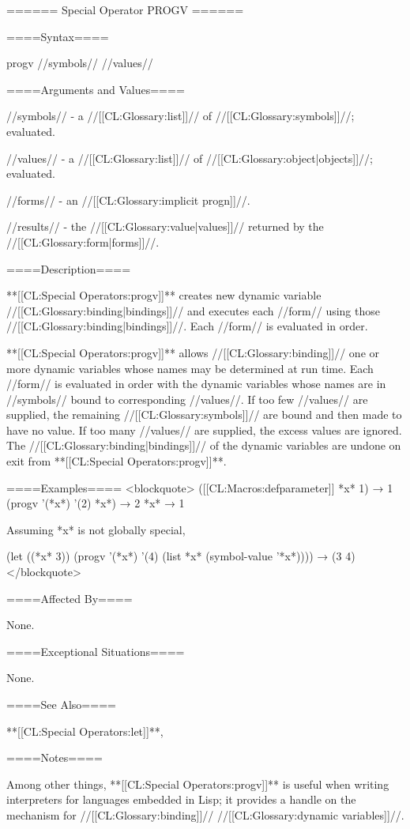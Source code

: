 ====== Special Operator PROGV ======

====Syntax====

\DefspecWithValues progv {//symbols// //values// } {}

====Arguments and Values====

//symbols// - a //[[CL:Glossary:list]]// of //[[CL:Glossary:symbols]]//; evaluated.

//values// - a //[[CL:Glossary:list]]// of //[[CL:Glossary:object|objects]]//; evaluated.

//forms// - an //[[CL:Glossary:implicit progn]]//.

//results// - the //[[CL:Glossary:value|values]]// returned by the //[[CL:Glossary:form|forms]]//.

====Description====

**[[CL:Special Operators:progv]]** creates new dynamic variable //[[CL:Glossary:binding|bindings]]// and executes each //form// using those //[[CL:Glossary:binding|bindings]]//. Each //form// is evaluated in order.

**[[CL:Special Operators:progv]]** allows //[[CL:Glossary:binding]]// one or more dynamic variables whose names may be determined at run time. Each //form// is evaluated in order with the dynamic variables whose names are in //symbols// bound to corresponding //values//. If too few //values// are supplied, the remaining //[[CL:Glossary:symbols]]// are bound and then made to have no value. If too many //values// are supplied, the excess values are ignored. The //[[CL:Glossary:binding|bindings]]// of the dynamic variables are undone on exit from **[[CL:Special Operators:progv]]**.

====Examples==== <blockquote> ([[CL:Macros:defparameter]] *x* 1) → 1 (progv '(*x*) '(2) *x*) → 2 *x* → 1

Assuming *x* is not globally special,

(let ((*x* 3)) (progv '(*x*) '(4) (list *x* (symbol-value '*x*)))) → (3 4) </blockquote>

====Affected By====

None.

====Exceptional Situations====

None.

====See Also====

**[[CL:Special Operators:let]]**, {\secref\Evaluation}

====Notes====

Among other things, **[[CL:Special Operators:progv]]** is useful when writing interpreters for languages embedded in Lisp; it provides a handle on the mechanism for //[[CL:Glossary:binding]]// //[[CL:Glossary:dynamic variables]]//.

